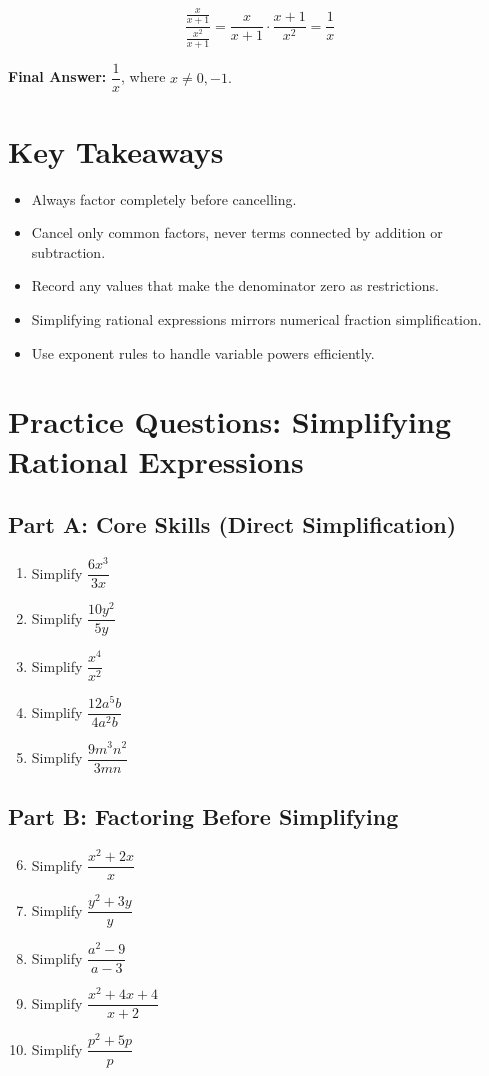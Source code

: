 \documentclass[12pt]{article}
\begin{document}
\[
\dfrac{\frac{x}{x+1}}{\frac{x^2}{x+1}} = \frac{x}{x+1} \cdot \frac{x+1}{x^2} = \frac{1}{x}
\]

\textbf{Final Answer:} \(\boxed{\dfrac{1}{x}}\), where \(x \ne 0, -1.\)

\section*{Key Takeaways}
\begin{itemize}
  \item Always factor completely before cancelling.
  \item Cancel only common factors, never terms connected by addition or subtraction.
  \item Record any values that make the denominator zero as restrictions.
  \item Simplifying rational expressions mirrors numerical fraction simplification.
  \item Use exponent rules to handle variable powers efficiently.
\end{itemize}

\newpage


\section*{Practice Questions: Simplifying Rational Expressions}

\subsection*{Part A: Core Skills (Direct Simplification)}
\begin{enumerate}
  \item Simplify \(\dfrac{6x^3}{3x}\)
  \item Simplify \(\dfrac{10y^2}{5y}\)
  \item Simplify \(\dfrac{x^4}{x^2}\)
  \item Simplify \(\dfrac{12a^5b}{4a^2b}\)
  \item Simplify \(\dfrac{9m^3n^2}{3mn}\)
\end{enumerate}

\subsection*{Part B: Factoring Before Simplifying}
\begin{enumerate}
  \setcounter{enumi}{5}
  \item Simplify \(\dfrac{x^2 + 2x}{x}\)
  \item Simplify \(\dfrac{y^2 + 3y}{y}\)
  \item Simplify \(\dfrac{a^2 - 9}{a - 3}\)
  \item Simplify \(\dfrac{x^2 + 4x + 4}{x + 2}\)
  \item Simplify \(\dfrac{p^2 + 5p}{p}\)
\end{enumerate}
\end{document}
